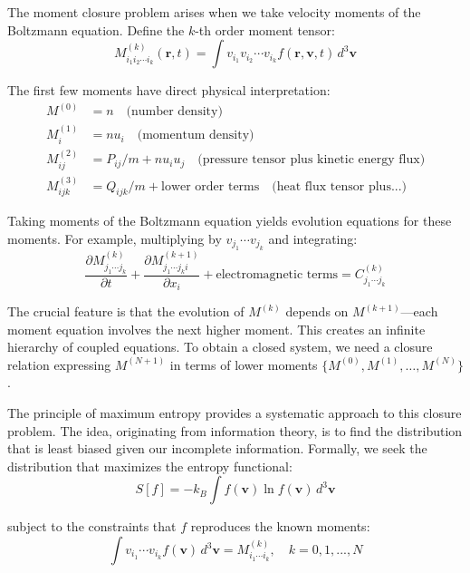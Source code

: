 \documentclass[12pt,a4paper]{article}
\newcommand{\vect}[1]{\mathbf{#1}}
\begin{document}
The moment closure problem arises when we take velocity moments of the Boltzmann equation. Define the $k$-th order moment tensor:
\begin{equation}
M_{i_1 i_2 \cdots i_k}^{(k)}(\vect{r}, t) = \int v_{i_1} v_{i_2} \cdots v_{i_k} f(\vect{r}, \vect{v}, t) \, d^3\vect{v}
\label{eq:moments_def}
\end{equation}

The first few moments have direct physical interpretation:
\begin{align}
M^{(0)} &= n \quad \text{(number density)}\label{eq:moment_0}\\
M_i^{(1)} &= n u_i \quad \text{(momentum density)}\label{eq:moment_1}\\
M_{ij}^{(2)} &= P_{ij}/m + n u_i u_j \quad \text{(pressure tensor plus kinetic energy flux)}\label{eq:moment_2}\\
M_{ijk}^{(3)} &= Q_{ijk}/m + \text{lower order terms} \quad \text{(heat flux tensor plus...)}\label{eq:moment_3}
\end{align}

Taking moments of the Boltzmann equation yields evolution equations for these moments. For example, multiplying by $v_{j_1} \cdots v_{j_k}$ and integrating:
\begin{equation}
\frac{\partial M_{j_1 \cdots j_k}^{(k)}}{\partial t} + \frac{\partial M_{j_1 \cdots j_k i}^{(k+1)}}{\partial x_i} + \text{electromagnetic terms} = C_{j_1 \cdots j_k}^{(k)}
\label{eq:moment_evolution}
\end{equation}

The crucial feature is that the evolution of $M^{(k)}$ depends on $M^{(k+1)}$—each moment equation involves the next higher moment. This creates an infinite hierarchy of coupled equations. To obtain a closed system, we need a closure relation expressing $M^{(N+1)}$ in terms of lower moments $\{M^{(0)}, M^{(1)}, \ldots, M^{(N)}\}$.

The principle of maximum entropy provides a systematic approach to this closure problem. The idea, originating from information theory, is to find the distribution that is least biased given our incomplete information. Formally, we seek the distribution that maximizes the entropy functional:
\begin{equation}
S[f] = -k_B \int f(\vect{v}) \ln f(\vect{v}) \, d^3\vect{v}
\label{eq:entropy_functional}
\end{equation}

subject to the constraints that $f$ reproduces the known moments:
\begin{equation}
\int v_{i_1} \cdots v_{i_k} f(\vect{v}) \, d^3\vect{v} = M_{i_1 \cdots i_k}^{(k)}, \quad k = 0,1,...,N
\label{eq:moment_constraints}
\end{equation}
\end{document}
